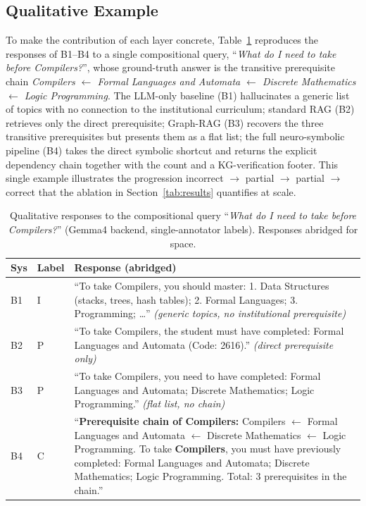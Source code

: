 \documentclass[12pt]{article}
\begin{document}
\subsection{Qualitative Example}

To make the contribution of each layer concrete, Table~\ref{tab:qual} reproduces the responses of B1--B4 to a single compositional query, ``\emph{What do I need to take before Compilers?}'', whose ground-truth answer is the transitive prerequisite chain \emph{Compilers $\leftarrow$ Formal Languages and Automata $\leftarrow$ Discrete Mathematics $\leftarrow$ Logic Programming}. The LLM-only baseline (B1) hallucinates a generic list of topics with no connection to the institutional curriculum; standard RAG (B2) retrieves only the direct prerequisite; Graph-RAG (B3) recovers the three transitive prerequisites but presents them as a flat list; the full neuro-symbolic pipeline (B4) takes the direct symbolic shortcut and returns the explicit dependency chain together with the count and a KG-verification footer. This single example illustrates the progression incorrect $\to$ partial $\to$ partial $\to$ correct that the ablation in Section~\ref{tab:results} quantifies at scale.

\begin{table}[ht]
\centering
\caption{Qualitative responses to the compositional query ``\emph{What do I need to take before Compilers?}'' (Gemma4 backend, single-annotator labels). Responses abridged for space.}
\label{tab:qual}
\small
\begin{tabular}{p{0.5cm}p{1cm}p{10.5cm}}
\hline
\textbf{Sys} & \textbf{Label} & \textbf{Response (abridged)} \\
\hline
B1 & I & ``To take Compilers, you should master: 1. Data Structures (stacks, trees, hash tables); 2. Formal Languages; 3. Programming; \ldots'' \emph{(generic topics, no institutional prerequisite)} \\
B2 & P & ``To take Compilers, the student must have completed: Formal Languages and Automata (Code: 2616).'' \emph{(direct prerequisite only)} \\
B3 & P & ``To take Compilers, you need to have completed: Formal Languages and Automata; Discrete Mathematics; Logic Programming.'' \emph{(flat list, no chain)} \\
B4 & C & ``\textbf{Prerequisite chain of Compilers:} Compilers $\leftarrow$ Formal Languages and Automata $\leftarrow$ Discrete Mathematics $\leftarrow$ Logic Programming. To take \textbf{Compilers}, you must have previously completed: Formal Languages and Automata; Discrete Mathematics; Logic Programming. Total: 3 prerequisites in the chain.'' \\
\hline
\end{tabular}
\end{table}
\end{document}
